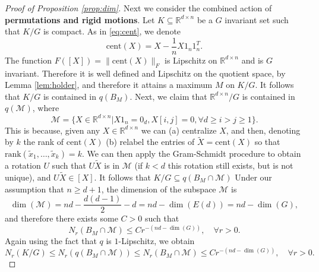 \documentclass[10pt,a4paper]{amsart}
\newcommand{\M}{\mathcal{M}}
\newcommand{\RR}{\mathbb{R}}
\newcommand{\cent}{\mathrm{cent}}
\begin{document}
\begin{proof}[Proof of Proposition \ref{prop:dim}]
Next we consider the combined action of \textbf{permutations and rigid motions}. Let $K\subseteq \RR^{d\times n} $ be a $G$ invariant set such that $K/G$ is compact. As in \eqref{eq:cent}, we denote 
\begin{equation*}
\cent(X)=X-\frac{1}{n}X1_n1_n^T. \end{equation*}
The  function  $F([X])=\|\cent(X)\|_F$ is Lipschitz on $\RR^{d\times n}$ and is $G$ invariant. Therefore it is  well defined and Lipschitz on the quotient space, by Lemma \ref{lem:holder}, and therefore it attains a maximum $M$ on $K/G$. It follows that  $K/G $ is contained in  $q(B_M)$. Next, we claim that $\RR^{d\times n}/G $ is  contained in $q(\M)$, where  
$$\mathcal{M}=\{X\in \RR^{d\times n}| X1_n=0_d, X[i,j]=0, \forall d\geq i>j \geq 1  \} .$$
This is because, given any $X\in \RR^{d\times n}$ we can (a)  centralize $X$, and then, denoting by $k$ the rank of $\cent(X)$ (b) relabel the entries of $\tilde X=\cent(X)$ so that $\mathrm{rank}(\tilde x_1,\ldots,\tilde x_k)=k $. We can then apply the Gram-Schmidt procedure to obtain a rotation $U$ such that $U\tilde X$ is in $\M$ (if $k<d$ this rotation still exists, but is not unique), and $U\tilde X\in[X] $. It follows that $K/G\subseteq q(B_M\cap \M) $
Under our assumption that $n\geq d+1 $, the dimension of the subspace $\M$ is 
$$\dim(\mathcal{M})=nd-\frac{d(d-1)}{2}-d=nd-\dim(E(d))=nd-\dim(G),$$
and therefore there exists some $C>0$ such that 
$$N_r(B_M\cap \M)\leq Cr^{-(nd-\dim(G))}, \quad \forall r>0. $$
Again using the fact that $q$ is $1$-Lipschitz, we obtain 
$$N_r(K/G)\leq N_r(q(B_M\cap \M))\leq N_r(B_M\cap \M) \leq Cr^{-(nd-\dim(G))}, \quad \forall r>0. $$

 \end{proof}
\end{document}
